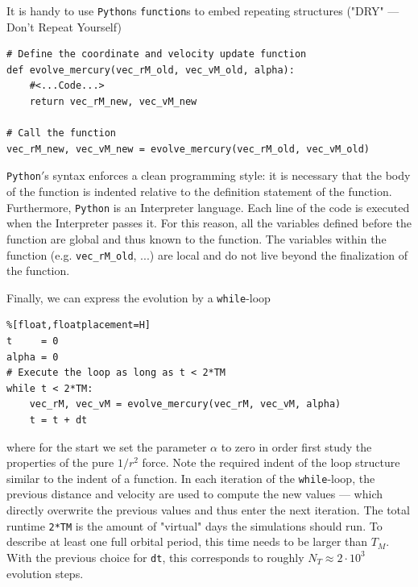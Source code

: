 \documentclass[12pt, UK english]{iopart}
\newcommand{\python}[0]{\texttt{Python}}
\begin{document}
It is handy to use \texttt{Python}s \texttt{function}s to embed repeating structures ("DRY" --- Don't Repeat Yourself)
\begin{lstlisting}
# Define the coordinate and velocity update function
def evolve_mercury(vec_rM_old, vec_vM_old, alpha):
	#<...Code...>
	return vec_rM_new, vec_vM_new

# Call the function
vec_rM_new, vec_vM_new = evolve_mercury(vec_rM_old, vec_vM_old)
\end{lstlisting}
\python{$\!'$}s syntax enforces a clean programming style: it is necessary that the body of the function is indented relative to the definition statement of the function.
Furthermore, \python{} is an Interpreter language.
Each line of the code is executed when the Interpreter passes it.
For this reason, all the variables defined before the function are global and thus known to the function.
The variables within the function (e.g. \texttt{vec\_rM\_old}, ...) are local and do not live beyond the finalization of the function.

Finally, we can express the evolution by a \texttt{while}-loop
\begin{lstlisting}%[float,floatplacement=H]
t     = 0
alpha = 0
# Execute the loop as long as t < 2*TM
while t < 2*TM:
	vec_rM, vec_vM = evolve_mercury(vec_rM, vec_vM, alpha)
	t = t + dt
\end{lstlisting}
where for the start we set the parameter $\alpha$ to zero in order first study the properties of the pure 
$1/r^2$ force.
Note the required indent of the loop structure similar to the indent of a function.
In each iteration of the \texttt{while}-loop, the previous distance and velocity are used to compute the new values --- which directly overwrite the previous values and thus enter the next iteration.
The total runtime \texttt{2*TM} is the amount of "virtual" days the simulations should run.
To describe at least one full orbital period, this time needs to be larger than $T_M$.
With the previous choice for \texttt{dt}, this corresponds to roughly $N_T \approx 2 \cdot 10^3$ evolution steps.


\end{document}
